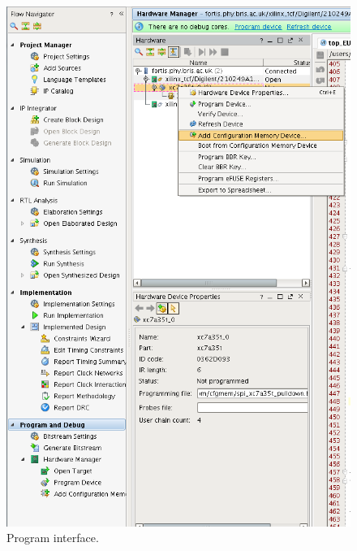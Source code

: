 \begin{figure}
  \centering
  \includegraphics[width=.80\textwidth]{./Images/AddMemory.png}
  \caption{Program interface.}\label{fig:hw_addMemory}
\end{figure}
 
